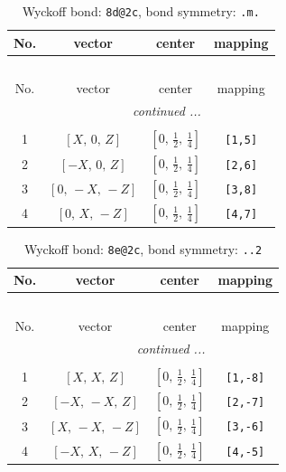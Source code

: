 \documentclass[fleqn,8pt]{jsarticle}
\begin{document}
\begin{longtable}{cccc}
\caption{Wyckoff bond: {\tt 8d@2c}, bond symmetry: {\tt .m.}}
 \\
 \hline \hline
No. & vector & center & mapping \\ \hline \endfirsthead

\multicolumn{3}{l}{\tablename\ \thetable{}} \\
 \hline \hline
No. & vector & center & mapping \\ \hline \endhead

 \hline \hline
\multicolumn{3}{r}{\footnotesize\it continued ...} \\ \endfoot

 \hline \hline
\multicolumn{3}{r}{} \\ \endlastfoot

1 & $\left[ X,\, 0,\, Z \right]$ & $\left[ 0,\, \frac{1}{2},\, \frac{1}{4} \right]$ & {\tt [1,5]} \\ \hline
2 & $\left[ - X,\, 0,\, Z \right]$ & $\left[ 0,\, \frac{1}{2},\, \frac{1}{4} \right]$ & {\tt [2,6]} \\ \hline
3 & $\left[ 0,\, - X,\, - Z \right]$ & $\left[ 0,\, \frac{1}{2},\, \frac{1}{4} \right]$ & {\tt [3,8]} \\ \hline
4 & $\left[ 0,\, X,\, - Z \right]$ & $\left[ 0,\, \frac{1}{2},\, \frac{1}{4} \right]$ & {\tt [4,7]} \\
\end{longtable}
\renewcommand{\arraystretch}{1.2}
\begin{longtable}{cccc}
\caption{Wyckoff bond: {\tt 8e@2c}, bond symmetry: {\tt ..2}}
 \\
 \hline \hline
No. & vector & center & mapping \\ \hline \endfirsthead

\multicolumn{3}{l}{\tablename\ \thetable{}} \\
 \hline \hline
No. & vector & center & mapping \\ \hline \endhead

 \hline \hline
\multicolumn{3}{r}{\footnotesize\it continued ...} \\ \endfoot

 \hline \hline
\multicolumn{3}{r}{} \\ \endlastfoot

1 & $\left[ X,\, X,\, Z \right]$ & $\left[ 0,\, \frac{1}{2},\, \frac{1}{4} \right]$ & {\tt [1,-8]} \\ \hline
2 & $\left[ - X,\, - X,\, Z \right]$ & $\left[ 0,\, \frac{1}{2},\, \frac{1}{4} \right]$ & {\tt [2,-7]} \\ \hline
3 & $\left[ X,\, - X,\, - Z \right]$ & $\left[ 0,\, \frac{1}{2},\, \frac{1}{4} \right]$ & {\tt [3,-6]} \\ \hline
4 & $\left[ - X,\, X,\, - Z \right]$ & $\left[ 0,\, \frac{1}{2},\, \frac{1}{4} \right]$ & {\tt [4,-5]} \\
\end{longtable}
\end{document}
